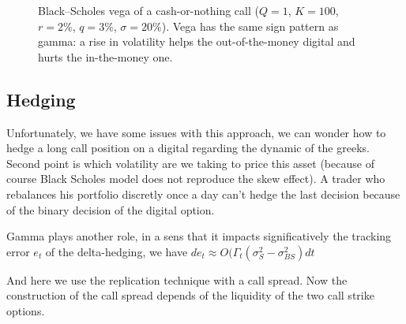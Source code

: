 \documentclass[11pt,a4paper]{article}
\theoremstyle{remark}
\begin{document}
\begin{figure}[htbp]
\centering
{}
\caption{Black--Scholes vega of a cash-or-nothing call ($Q=1$, $K=100$,
$r=2\%$, $q=3\%$, $\sigma=20\%$). Vega has the same sign pattern as gamma:
a rise in volatility helps the out-of-the-money digital and hurts the
in-the-money one.}
\label{fig:bs-digital-vega}
\end{figure}

\subsection{Hedging}

Unfortunately, we have some issues with this approach, we can wonder how to hedge a long call position on a digital regarding the dynamic of the greeks. Second point is which volatility are we taking to price this asset (because of course Black Scholes model does not reproduce the skew effect). A trader who rebalances his portfolio discretly once a day can't hedge the last decision because of the binary decision of the digital option.


Gamma plays another role, in a sens that it impacts significatively the tracking error $e_t$ of the delta-hedging, we have $de_t \approx O(\Gamma_t(\sigma_S^2-\sigma_{BS}^2)dt$


And here we use the replication technique with a call spread. Now the construction of the call spread depends of the liquidity of the two call strike options.
\end{document}
